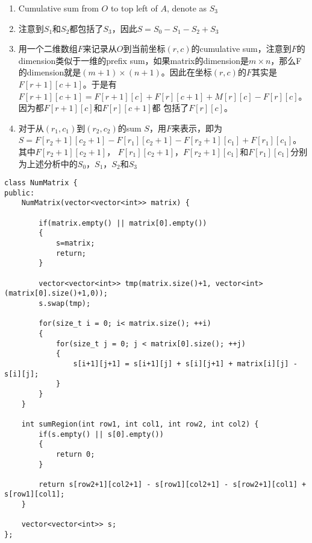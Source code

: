 \begin{enumerate}
\begin{figure}[H]
\end{figure}
\item Cumulative sum from $O$ to top left of $A$, denote as $S_3$
\begin{figure}[H]
\end{figure}
\item 注意到$S_1$和$S_2$都包括了$S_3$，因此$S=S_0-S_1-S_2+S_3$
\item 用一个二维数组$F$来记录从$O$到当前坐标$(r,c)$的cumulative sum，注意到$F$的dimension类似于一维的prefix sum，如果matrix的dimension是$m\times n$，那么F的dimension就是$(m+1)\times(n+1)$。因此在坐标$(r,c)$的$F$其实是$F[r+1][c+1]$。于是有$F[r+1][c+1]=F[r+1][c]+F[r][c+1]+M[r][c]-F[r][c]$。因为都$F[r+1][c]$和$F[r][c+1]$都
包括了$F[r][c]$。
\item 对于从$(r_1,c_1)$到$(r_2,c_2)$的sum $S$，用$F$来表示，即为$S=F[r_2+1][c_2+1] - F[r_1][c_2+1] - F[r_2+1][c_1] + F[r_1][c_1]$。其中$F[r_2+1][c_2+1]$， $F[r_1][c_2+1]$，$F[r_2+1][c_1]$和$F[r_1][c_1]$分别为上述分析中的$S_0$，$S_1$，$S_2$和$S_3$
\end{enumerate}
\setcounter{lstlisting}{0}
\begin{lstlisting}[style=customc, caption={Caching}]
class NumMatrix {
public:
    NumMatrix(vector<vector<int>> matrix) {
        
        if(matrix.empty() || matrix[0].empty())
        {
            s=matrix;
            return;
        }
        
        vector<vector<int>> tmp(matrix.size()+1, vector<int>(matrix[0].size()+1,0));
        s.swap(tmp);
        
        for(size_t i = 0; i< matrix.size(); ++i)
        {
            for(size_t j = 0; j < matrix[0].size(); ++j)
            {
                s[i+1][j+1] = s[i+1][j] + s[i][j+1] + matrix[i][j] - s[i][j];
            }
        }
    }
    
    int sumRegion(int row1, int col1, int row2, int col2) {
        if(s.empty() || s[0].empty())
        {
            return 0;
        }
        
        return s[row2+1][col2+1] - s[row1][col2+1] - s[row2+1][col1] + s[row1][col1];
    }
    
    vector<vector<int>> s;
};
\end{lstlisting}

